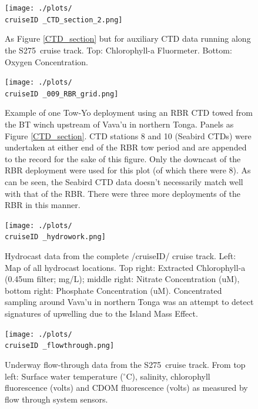\documentclass[letterpaper,11pt]{article}
\newcommand{\cruiseID}{S275}
\begin{document}
\begin{figure}[ht]
\centering
\texttt{[image: ./plots/\\cruiseID \_CTD\_section\_2.png]}
\caption[Auxiliary CTD data running along the \cruiseID\ cruise track]{As Figure \ref{CTD_section} but for auxiliary CTD data running along the \cruiseID\ cruise track. Top: Chlorophyll-a Fluormeter. Bottom: Oxygen Concentration.}
\label{CTD_section_2}
\end{figure}

\begin{figure}[ht]
\centering
\texttt{[image: ./plots/\\cruiseID \_009\_RBR\_grid.png]}
\caption[CTD data from RBR Tow-Yo]{Example of one Tow-Yo deployment using an RBR CTD towed from the BT winch upstream of Vava'u in northern Tonga. Panels as Figure \ref{CTD_section}. CTD stations 8 and 10 (Seabird CTDs) were undertaken at either end of the RBR tow period and are appended to the record for the sake of this figure. Only the downcast of the RBR deployment were used for this plot (of which there were 8). As can be seen, the Seabird CTD data doesn't necessarily match well with that of the RBR. There were three more deployments of the RBR in this manner.}
\label{CTD_RBR}
\end{figure}


\begin{figure}[t]
\centering
\texttt{[image: ./plots/\\cruiseID \_hydrowork.png]}
\caption[Hydrocast summary along \cruiseID\ cruise track]{Hydrocast data from the complete /cruiseID/ cruise track. Left: Map of all hydrocast locations. Top right: Extracted Chlorophyll-a (0.45um filter; mg/L); middle right: Nitrate Concentration (uM), bottom right: Phosphate Concentration (uM). Concentrated sampling around Vava'u in northern Tonga was an attempt to detect signatures of upwelling due to the Island Mass Effect.}
\label{hydrowork}
\end{figure}

\begin{figure}[t]
\centering
\texttt{[image: ./plots/\\cruiseID \_flowthrough.png]}
\caption[Underway flow-through data from the \cruiseID\ cruise track]{Underway flow-through data from the \cruiseID\ cruise track. From top left: Surface water temperature ($^{\circ}$C), salinity, chlorophyll fluorescence (volts) and CDOM fluorescence (volts) as measured by flow through system sensors.}
\label{hourly}
\end{figure}
\end{document}
